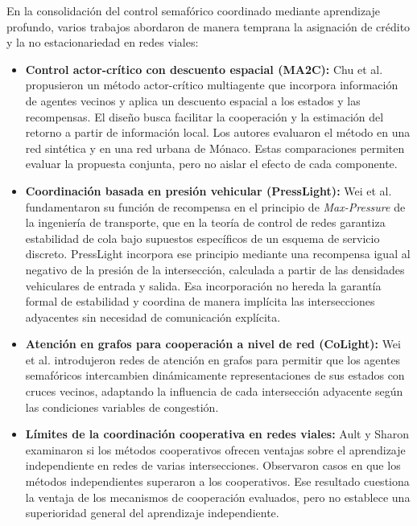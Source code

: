 En la consolidación del control semafórico coordinado mediante aprendizaje profundo, varios trabajos abordaron de manera temprana la asignación de crédito y la no estacionariedad en redes viales:
\begin{itemize}
    \item \textbf{Control actor-crítico con descuento espacial (MA2C):} Chu et al. \cite{Chu2019} propusieron un método actor-crítico multiagente que incorpora información de agentes vecinos y aplica un descuento espacial a los estados y las recompensas. El diseño busca facilitar la cooperación y la estimación del retorno a partir de información local. Los autores evaluaron el método en una red sintética y en una red urbana de Mónaco. Estas comparaciones permiten evaluar la propuesta conjunta, pero no aislar el efecto de cada componente.
    \item \textbf{Coordinación basada en presión vehicular (PressLight):} Wei et al. \cite{presslight2019} fundamentaron su función de recompensa en el principio de \textit{Max-Pressure} de la ingeniería de transporte, que en la teoría de control de redes garantiza estabilidad de cola bajo supuestos específicos de un esquema de servicio discreto. PressLight incorpora ese principio mediante una recompensa igual al negativo de la presión de la intersección, calculada a partir de las densidades vehiculares de entrada y salida. Esa incorporación no hereda la garantía formal de estabilidad y coordina de manera implícita las intersecciones adyacentes sin necesidad de comunicación explícita.
    \item \textbf{Atención en grafos para cooperación a nivel de red (CoLight):} Wei et al. \cite{colight2019} introdujeron redes de atención en grafos para permitir que los agentes semafóricos intercambien dinámicamente representaciones de sus estados con cruces vecinos, adaptando la influencia de cada intersección adyacente según las condiciones variables de congestión.
    \item \textbf{Límites de la coordinación cooperativa en redes viales:} Ault y Sharon \cite{Ault2022_MARL_Limitations} examinaron si los métodos cooperativos ofrecen ventajas sobre el aprendizaje independiente en redes de varias intersecciones. Observaron casos en que los métodos independientes superaron a los cooperativos. Ese resultado cuestiona la ventaja de los mecanismos de cooperación evaluados, pero no establece una superioridad general del aprendizaje independiente.
\end{itemize}

